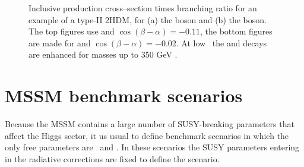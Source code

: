 \begin{figure}[h!]
\begin{center}
\end{center}
\caption{Inclusive production cross--section times branching ratio for an example
of a type-II \ac{2HDM}, for (a) the \PHiggs boson and (b) the \PHiggsps boson. The
top figures use  and $\cos{(\beta-\alpha)}=-0.11$, the bottom
figures are made for  and $\cos{(\beta-\alpha)}=-0.02$. At low \tanb~the \Htohh and
\AtoZh decays are enhanced for masses up to 350 GeV \cite{2HDM-II}.}
\label{fig:2hdm_Hxsbr}
\end{figure}


\section{MSSM benchmark scenarios}
\label{sec:theory_BSM_models}
Because the MSSM contains a large number of
SUSY-breaking parameters that affect the Higgs
sector, it us usual to define benchmark scenarios 
in which the only free parameters are \mA~and \tanb.
In these scenarios the SUSY parameters entering in 
the radiative corrections are fixed to define the scenario.

